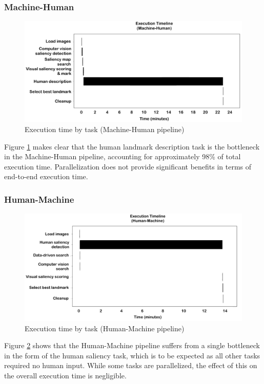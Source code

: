 \subsubsection{Machine-Human}
\begin{figure}[htbp]
  \centering
  \includegraphics[width=\textwidth]{images/timeline_mh.pdf}
  \caption{Execution time by task (Machine-Human pipeline)}
  \label{fig:plot:timeline:mh}
\end{figure}

Figure \ref{fig:plot:timeline:mh} makes clear that the human landmark description task is the bottleneck in the Machine-Human pipeline, accounting for approximately 98\% of total execution time. Parallelization does not provide significant benefits in terms of end-to-end execution time.

\subsubsection{Human-Machine}
\begin{figure}[htbp]
  \centering
  \includegraphics[width=\textwidth]{images/timeline_hm.pdf}
  \caption{Execution time by task (Human-Machine pipeline)}
  \label{fig:plot:timeline:hm}
\end{figure}

Figure \ref{fig:plot:timeline:hm} shows that the Human-Machine pipeline suffers from a single bottleneck in the form of the human saliency task, which is to be expected as all other tasks required no human input. While some tasks are parallelized, the effect of this on the overall execution time is negligible.

